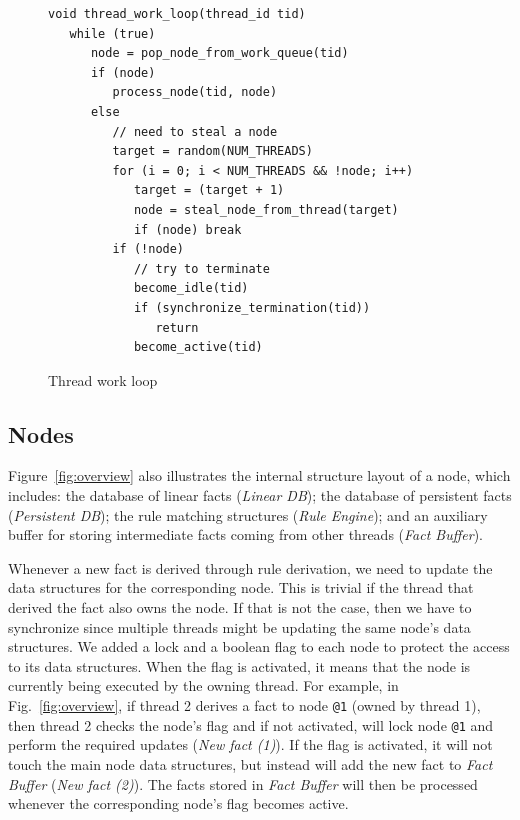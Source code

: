 \documentclass{sigplanconf}
\begin{document}
\begin{figure}[ht]
{\footnotesize
\begin{Verbatim}
void thread_work_loop(thread_id tid)
   while (true)
      node = pop_node_from_work_queue(tid)
      if (node)
         process_node(tid, node)
      else
         // need to steal a node
         target = random(NUM_THREADS)
         for (i = 0; i < NUM_THREADS && !node; i++)
            target = (target + 1)
            node = steal_node_from_thread(target)
            if (node) break
         if (!node)
            // try to terminate
            become_idle(tid)
            if (synchronize_termination(tid))
               return
            become_active(tid)
\end{Verbatim}
}
\caption{Thread work loop}
\label{code:work_loop}
\end{figure}

\subsection{Nodes}

Figure~\ref{fig:overview} also illustrates the internal
structure layout of a node, which includes: the database of linear
facts (\emph{Linear DB}); the database of persistent facts
(\emph{Persistent DB}); the rule matching structures (\emph{Rule
Engine}); and an auxiliary buffer for storing intermediate facts
coming from other threads (\emph{Fact Buffer}).

Whenever a new fact is derived through rule derivation, we need to
update the data structures for the corresponding node. This is trivial
if the thread that derived the fact also owns the node. If that is not
the case, then we have to synchronize since multiple threads might be
updating the same node's data structures. We added a lock and a
boolean flag to each node to protect the access to its data
structures. When the flag is activated, it means that the node is
currently being executed by the owning thread. For example, in
Fig.~\ref{fig:overview}, if thread 2 derives a fact to
node \texttt{@1} (owned by thread 1), then thread 2 checks the node's
flag and if not activated, will lock node \texttt{@1} and perform the
required updates (\emph{New fact (1)}). If the flag is activated, it
will not touch the main node data structures, but instead will add the
new fact to \emph{Fact Buffer} (\emph{New fact (2)}). The facts stored
in \emph{Fact Buffer} will then be processed whenever the
corresponding node's flag becomes active.
\end{document}
